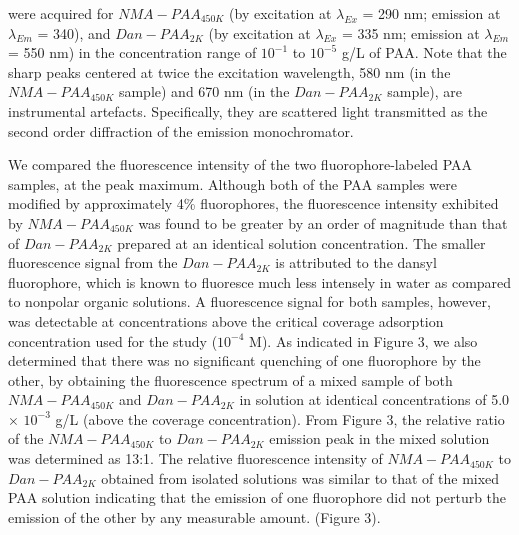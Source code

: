 \documentclass[journal=mamobx,manuscript=article]{achemso}
\begin{document}
were acquired for $NMA-PAA_{450K}$ (by excitation at $\lambda_{Ex}$ = 290 nm; emission at $\lambda_{Em}$ = 340),\cite{Anghel1998} and $Dan-PAA_{2K}$ (by excitation at $\lambda_{Ex}$ = 335 nm; emission at $\lambda_{Em}$ = 550 nm)\cite{Bednar1985} in the concentration range of $10^{-1}$ to $10^{-5}$ g/L of PAA.  Note that the sharp peaks centered at twice the excitation wavelength, 580 nm (in the $NMA-PAA_{450K}$ sample) and 670 nm (in the $Dan-PAA_{2K}$ sample), are instrumental artefacts.  Specifically, they are scattered light transmitted as the second order diffraction of the emission monochromator. 

We compared the fluorescence intensity of the two fluorophore-labeled PAA samples, at the peak maximum.  Although both of the PAA samples were modified by approximately 4\% fluorophores, the fluorescence intensity exhibited by $NMA-PAA_{450K}$ was found to be greater by an order of magnitude than that of $Dan-PAA_{2K}$ prepared at an identical solution concentration.  The smaller fluorescence signal from the $Dan-PAA_{2K}$ is attributed to the dansyl fluorophore, which is known to fluoresce much less intensely in water as compared to nonpolar organic solutions.\cite{weber1954fluorescent,Bednar1985,Chen1983}  A fluorescence signal for both samples, however, was detectable at concentrations above the critical coverage adsorption concentration used for the study ($10^{-4}$ M).  As indicated in Figure 3, we also determined that there was no significant quenching of one fluorophore by the other, by obtaining the fluorescence spectrum of a mixed sample of both $NMA-PAA_{450K}$ and $Dan-PAA_{2K}$ in solution at identical concentrations of 5.0 $\times$ $10^{-3}$ g/L (above the coverage concentration).  From Figure 3, the relative ratio of the $NMA-PAA_{450K}$ to $Dan-PAA_{2K}$ emission peak in the mixed solution was determined as 13:1.  The relative fluorescence intensity of $NMA-PAA_{450K}$ to $Dan-PAA_{2K}$ obtained from isolated solutions was similar to that of the mixed PAA solution indicating that the emission of one fluorophore did not perturb the emission of the other by any measurable amount. (Figure 3).
\end{document}
